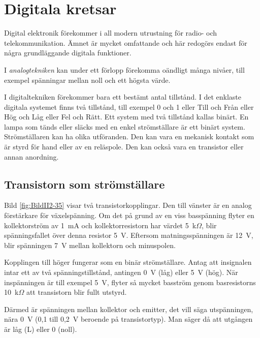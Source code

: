 \section{Digitala kretsar}
\label{digitala kretsar}

Digital elektronik förekommer i all modern utrustning för radio- och telekommunikation. 
Ämnet är mycket omfattande och här redogörs endast för några grundläggande digitala funktioner.

I \emph{analogtekniken} kan under ett förlopp förekomma oändligt många nivåer, till exempel spänningar mellan noll och ett högsta värde.

I digitaltekniken förekommer bara ett bestämt antal tillstånd. I det enklaste digitala systemet finns två tillstånd, till exempel 0 och 1 eller Till och Från eller Hög och Låg eller Fel och Rätt. 
Ett system med två tillstånd kallas binärt. En lampa som tänds eller släcks med en enkel strömställare är ett binärt system. Strömställaren kan ha olika utföranden. Den kan vara en mekanisk kontakt som är styrd för hand eller av en reläspole. Den kan också vara en transistor eller annan anordning.

\subsection{Transistorn som strömställare}


Bild \ref{fig:BildII2-35} visar två transistorkopplingar.
Den till vänster är en analog förstärkare för växelspänning.
Om det på grund av en viss basspänning flyter en kollektorström av 1~mA och
kollektorresistorn har värdet 5~k\(\Omega\), blir spänningsfallet över denna resistor 5~V. 
Eftersom matningsspänningen är 12~V, blir spänningen 7~V mellan kollektorn och minuspolen.

Kopplingen till höger fungerar som en binär strömställare. Antag att insignalen intar ett av två spänningstillstånd, antingen 0~V (låg) eller 5~V (hög). När
inspänningen är till exempel 5~V, flyter så mycket basström genom basresistorns 10~k\(\Omega\) att transistorn blir fullt utstyrd.

Därmed är spänningen mellan kollektor och emitter, det vill säga utspänningen, nära 0~V
(0,1 till 0,2~V beroende på transistortyp). Man säger då att utgången är låg (L) eller 0 (noll).

